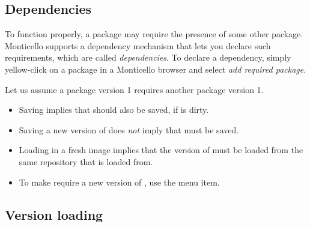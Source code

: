 \documentclass[a4paper,10pt,twoside]{book}
\begin{document}
 

\subsection{Dependencies}

To function properly, a package may require the presence of some other package. 
Monticello supports a dependency mechanism that lets you declare such requirements, which are called \emph{dependencies}. To declare a dependency, simply yellow-click on a package in a Monticello browser and select \emph{add required package}.  

Let us assume a package  version 1 requires another package  version 1.

\begin{itemize}
\item Saving  implies that  should also be saved, if  is dirty.
\item Saving a new version of  does \emph{not} imply that  must be saved.
\item Loading  in a fresh image implies that the  version of  must be loaded from the same repository that  is loaded from.  
\item To make  require a new version of , use the  menu item. 
\end{itemize}


\subsection{Version loading}
\end{document}
